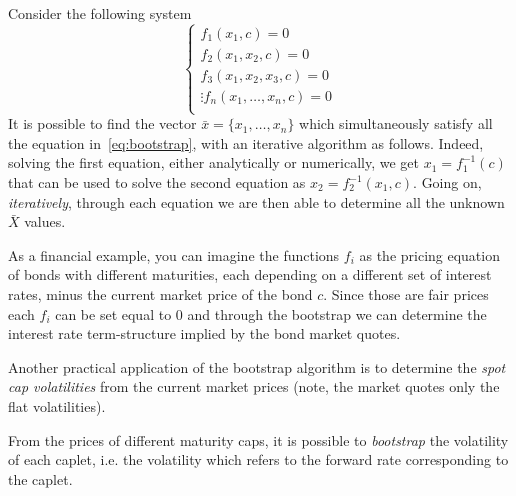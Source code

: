 \documentclass[12pt,a4paper]{book}
\begin{document}
Consider the following system 
\begin{equation}
	\begin{cases}
		f_1(x_1, c) = 0\\
		f_2(x_1, x_2, c) = 0\\
		f_3(x_1, x_2, x_3, c) = 0\\
		\vdots
		f_n(x_1,\ldots,x_n, c) = 0\\
	\end{cases}
\label{eq:bootstrap}
\end{equation}
It is possible to find the vector $\bar{x} = \{x_1,\ldots,x_n\}$ which simultaneously satisfy all the equation in~\ref{eq:bootstrap}, with an iterative algorithm as follows.
Indeed, solving the first equation, either analytically or numerically, we get $x_1 = f_1^{-1}(c)$ that can be used to solve the second equation as $x_2 = f_2^{-1}(x_1, c)$.
Going on, \emph{iteratively}, through each equation we are then able to determine all the unknown $\bar{X}$ values.

As a financial example, you can imagine the functions $f_i$ as the pricing equation of bonds with different maturities, each depending on a different set of interest rates, minus the current market price of the bond $c$. Since those are fair prices each $f_i$ can be set equal to 0 and through the bootstrap we can determine the interest rate term-structure implied by the bond market quotes. 

Another practical application of the bootstrap algorithm is to determine the \emph{spot cap volatilities} from the current market prices (note, the market quotes only the flat volatilities).

From the prices of different maturity caps, it is possible to \emph{bootstrap} the volatility of each caplet, i.e. the volatility which refers to the forward rate corresponding to the caplet.
\end{document}
